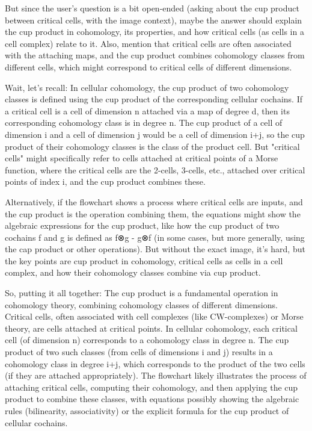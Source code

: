 But since the user's question is a bit open-ended (asking about the cup product between critical cells, with the image context), maybe the answer should explain the cup product in cohomology, its properties, and how critical cells (as cells in a cell complex) relate to it. Also, mention that critical cells are often associated with the attaching maps, and the cup product combines cohomology classes from different cells, which might correspond to critical cells of different dimensions.

Wait, let's recall: In cellular cohomology, the cup product of two cohomology classes is defined using the cup product of the corresponding cellular cochains. If a critical cell is a cell of dimension n attached via a map of degree d, then its corresponding cohomology class is in degree n. The cup product of a cell of dimension i and a cell of dimension j would be a cell of dimension i+j, so the cup product of their cohomology classes is the class of the product cell. But "critical cells" might specifically refer to cells attached at critical points of a Morse function, where the critical cells are the 2-cells, 3-cells, etc., attached over critical points of index i, and the cup product combines these.

Alternatively, if the flowchart shows a process where critical cells are inputs, and the cup product is the operation combining them, the equations might show the algebraic expressions for the cup product, like how the cup product of two cochains f and g is defined as f⊗g - g⊗f (in some cases, but more generally, using the cap product or other operations). But without the exact image, it's hard, but the key points are cup product in cohomology, critical cells as cells in a cell complex, and how their cohomology classes combine via cup product.

So, putting it all together: The cup product is a fundamental operation in cohomology theory, combining cohomology classes of different dimensions. Critical cells, often associated with cell complexes (like CW-complexes) or Morse theory, are cells attached at critical points. In cellular cohomology, each critical cell (of dimension n) corresponds to a cohomology class in degree n. The cup product of two such classes (from cells of dimensions i and j) results in a cohomology class in degree i+j, which corresponds to the product of the two cells (if they are attached appropriately). The flowchart likely illustrates the process of attaching critical cells, computing their cohomology, and then applying the cup product to combine these classes, with equations possibly showing the algebraic rules (bilinearity, associativity) or the explicit formula for the cup product of cellular cochains.

